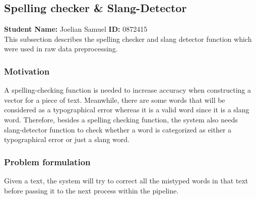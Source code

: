 \subsection{Spelling checker \& Slang-Detector}
\textbf{Student Name: }Joelian Samuel \textbf{ ID:} 0872415\\
This subsection describes the spelling checker and slang detector function which were used in raw data preprocessing.
\subsubsection*{Motivation}
A spelling-checking function is needed to increase accuracy when constructing a vector for a piece of text. Meanwhile, there are some words that will be considered as a typographical error whereas it is a valid word since it is a slang word. Therefore, besides a spelling checking function, the system also needs slang-detector function to check whether a word is categorized as either a typographical error or just a slang word.
\subsubsection*{Problem formulation}
Given a text, the system will try to correct all the mistyped words in that text before passing it to the next process within the pipeline.
